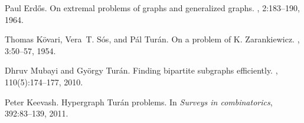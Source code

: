 \documentclass[12pt]{article}
\begin{document}

\begin{thebibliography}{1}

Paul Erd\H{o}s.
\newblock On extremal problems of graphs and generalized graphs.
, 2:183--190, 1964.

Thomas K\"ovari, Vera~T. S\'os, and P{\'a}l Tur\'an.
\newblock On a problem of {K}. {Z}arankiewicz.
, 3:50--57, 1954.

Dhruv Mubayi and Gy\"{o}rgy {T}ur\'{a}n.
\newblock Finding bipartite subgraphs efficiently.
, 110(5):174--177, 2010.

Peter Keevash.
\newblock Hypergraph {T}ur\'{a}n problems.
\newblock In {\em Surveys in combinatorics}, 392:83--139, 2011.

\end{thebibliography}
\end{document}
